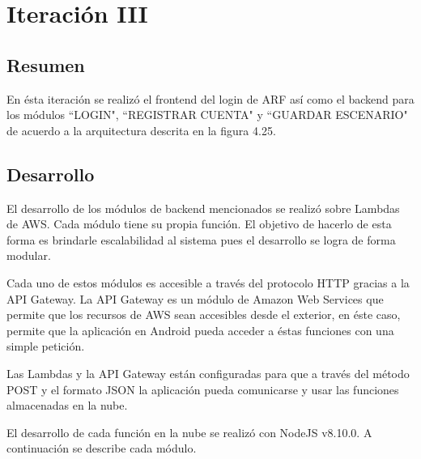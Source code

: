 \section{Iteración III}
\subsection{Resumen}
En ésta iteración se realizó el frontend del login de ARF así como el backend para los módulos ``LOGIN", ``REGISTRAR CUENTA" y ``GUARDAR ESCENARIO" de acuerdo a la arquitectura descrita en la figura 4.25. \par

\subsection{Desarrollo}
El desarrollo de los módulos de backend mencionados se realizó sobre Lambdas de AWS. Cada módulo tiene su propia función. El objetivo de hacerlo de esta forma es brindarle escalabilidad al sistema pues el desarrollo se logra de forma modular.\par
Cada uno de estos módulos es accesible a través del protocolo HTTP gracias a la API Gateway. La API Gateway es un módulo de Amazon Web Services que permite que los recursos de AWS sean accesibles desde el exterior, en éste caso, permite que la aplicación en Android pueda acceder a éstas funciones con una simple petición.\par
Las Lambdas y la API Gateway están configuradas para que a través del método POST y el formato JSON la aplicación pueda comunicarse y usar las funciones almacenadas en la nube.\par
El desarrollo de cada función en la nube se realizó con NodeJS v8.10.0. A continuación se describe cada módulo. \par
